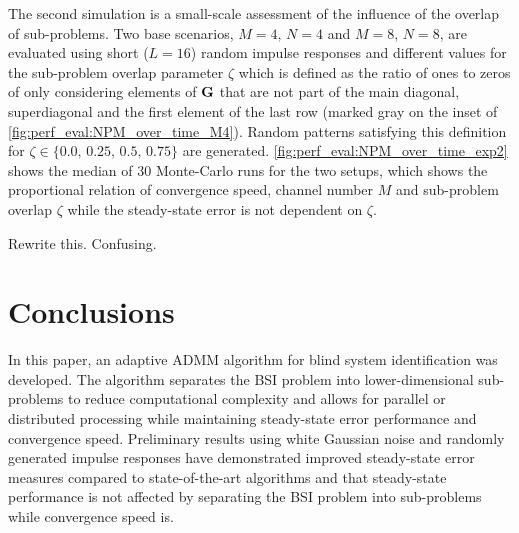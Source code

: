 \documentclass{article}
\begin{document}
The second simulation is a small-scale assessment of the influence of the overlap of sub-problems.
Two base scenarios, \(M=4,\,N=4\) and \(M=8,\,N=8\), are evaluated using short (\(L=16\)) random impulse responses and different values for the sub-problem overlap parameter \(\zeta\) which is defined as the ratio of ones to zeros of only considering elements of \(\bm{\mathrm{G}}\) that are not part of the main diagonal, superdiagonal and the first element of the last row (marked gray on the inset of \autoref{fig:perf_eval:NPM_over_time_M4}).
Random patterns satisfying this definition for \(\zeta \in \{0.0,\,0.25,\,0.5,\,0.75\}\) are generated.
\autoref{fig:perf_eval:NPM_over_time_exp2} shows the median of 30 Monte-Carlo runs for the two setups, which shows the proportional relation of convergence speed, channel number \(M\) and sub-problem overlap \(\zeta\) while the steady-state error is not dependent on \(\zeta\).
\begin{todo}
    Rewrite this. Confusing.
\end{todo}




\section{Conclusions}
\label{sec:conclusion}
In this paper, an adaptive ADMM algorithm for blind system identification was developed.
The algorithm separates the BSI problem into lower-dimensional sub-problems to reduce computational complexity and allows for parallel or distributed processing while maintaining steady-state error performance and convergence speed.
Preliminary results using white Gaussian noise and randomly generated impulse responses have demonstrated improved steady-state error measures compared to state-of-the-art algorithms and that steady-state performance is not affected by separating the BSI problem into sub-problems while convergence speed is.



\end{document}
